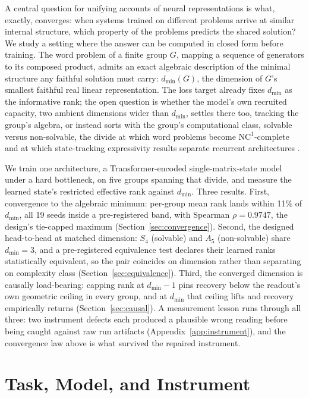 \documentclass{article}
\newcommand{\dmin}{d_{\min}}
\begin{document}
A central question for unifying accounts of neural representations is
what, exactly, converges: when systems trained on different problems
arrive at similar internal structure, which property of the problems
predicts the shared solution? We study a setting where the answer can be
computed in closed form before training. The word problem of a finite
group $G$, mapping a sequence of generators to its composed product,
admits an exact algebraic description of the minimal structure any
faithful solution must carry: $\dmin(G)$, the dimension of $G$'s smallest
faithful real linear representation. The loss target already fixes
$\dmin$ as the informative rank; the open question is whether the model's
own recruited capacity, two ambient dimensions wider than $\dmin$,
settles there too, tracking the group's algebra, or instead sorts with
the group's computational class,
solvable versus non-solvable, the divide at which word problems become
$\mathrm{NC}^1$-complete \citep{barrington1989} and at which
state-tracking expressivity results separate recurrent architectures
\citep{merrill2024illusion, grazzi2025negative}.

We train one architecture, a Transformer-encoded single-matrix-state
model under a hard bottleneck, on five groups spanning that divide, and
measure the learned state's restricted effective rank against $\dmin$.
Three results. First, convergence to the algebraic minimum: per-group
mean rank lands within 11\% of $\dmin$, all 19 seeds inside a
pre-registered band, with Spearman $\rho = 0.9747$, the design's
tie-capped maximum (Section~\ref{sec:convergence}).
Second, the designed
head-to-head at matched dimension: $S_4$ (solvable) and $A_5$
(non-solvable) share $\dmin = 3$, and a pre-registered equivalence test
declares their learned ranks statistically equivalent, so the pair
coincides on dimension rather than separating on complexity class
(Section~\ref{sec:equivalence}).
Third, the converged
dimension is causally load-bearing: capping rank at $\dmin{-}1$ pins
recovery below the readout's own geometric ceiling in every group, and
at $\dmin$ that ceiling lifts and recovery empirically returns
(Section~\ref{sec:causal}).
A measurement lesson runs
through all three: two instrument defects each produced a plausible
wrong reading before being caught against raw run artifacts
(Appendix~\ref{app:instrument}), and the convergence law above is what
survived the repaired instrument.

\section{Task, Model, and Instrument}
\label{sec:setup}
\end{document}
